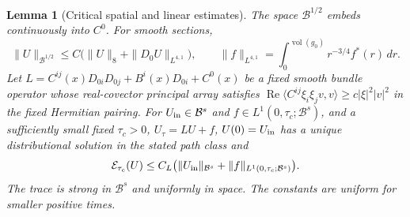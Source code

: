 \documentclass[11pt]{article}
\numberwithin{equation}{section}
\newtheorem{lemma}[theorem]{Lemma}
\theoremstyle{definition}
\theoremstyle{remark}
\begin{document}
\begin{lemma}[Critical spatial and linear estimates]
\label{lem:critical-linear}
The space $\mathcal B^{1/2}$ embeds continuously into $C^0$.
For smooth sections,
\begin{equation}\label{eq:critical-lorentz-embedding}
 \|U\|_{\mathcal B^{1/2}}
 \le C\bigl(\|U\|_8+\|D_0U\|_{L^{4,1}}\bigr),
 \qquad
 \|f\|_{L^{4,1}}
 =\int_0^{\operatorname{vol}(g_0)}r^{-3/4}f^*(r)\,dr .
\end{equation}
Let $L=C^{ij}(x)D_{0i}D_{0j}+B^i(x)D_{0i}+C^0(x)$
be a fixed smooth bundle operator whose real-covector
principal array satisfies
$\operatorname{Re}\langle C^{ij}\xi_i\xi_jv,v\rangle
\ge c|\xi|^2|v|^2$ in the fixed Hermitian pairing.
For $U_{\rm in}\in\mathcal B^s$ and
$f\in L^1(0,\tau_c;\mathcal B^s)$, and a sufficiently
small fixed $\tau_c>0$,
$U_\tau=LU+f$, $U(0)=U_{\rm in}$ has a unique
distributional solution in the stated path class and
\begin{equation}\label{eq:critical-linear-estimate}
 \mathcal E_{\tau_c}(U)
 \le C_L\bigl(\|U_{\rm in}\|_{\mathcal B^s}
                   +\|f\|_{L^1(0,\tau_c;\mathcal B^s)}\bigr).
\end{equation}
The trace is strong in $\mathcal B^s$ and uniformly in
space. The constants are uniform for smaller positive times.
\end{lemma}
\end{document}
